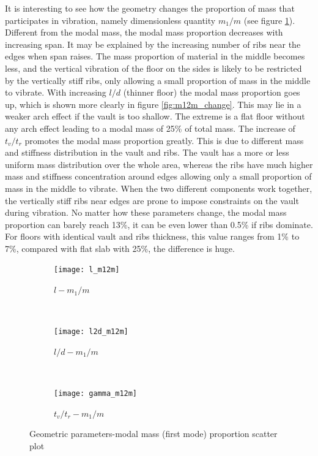 It is interesting to see how the geometry changes the proportion of mass that participates in vibration, namely dimensionless quantity $m_1/m$ (see figure \ref{fig:geom-m12m}). Different from the modal mass, the modal mass proportion decreases with increasing span. It may be explained by the increasing number of ribs near the edges when span raises. The mass proportion of material in the middle becomes less, and the vertical vibration of the floor on the sides is likely to be restricted by the vertically stiff ribs, only allowing a small proportion of mass in the middle to vibrate. With increasing $l/d$ (thinner floor) the modal mass proportion goes up, which is shown more clearly in figure \ref{fig:m12m_change}. This may lie in a weaker arch effect if the vault is too shallow. The extreme is a flat floor without any arch effect leading to a modal mass of 25\% of total mass. The increase of $t_v/t_r$ promotes the modal mass proportion greatly. This is due to different mass and stiffness distribution in the vault and ribs. The vault has a more or less uniform mass distribution over the whole area, whereas the ribs have much higher mass and stiffness concentration around edges allowing only a small proportion of mass in the middle to vibrate. When the two different components work together, the vertically stiff ribs near edges are prone to impose constraints on the vault during vibration. 
No matter how these parameters change, the modal mass proportion can barely reach 13\%, it can be even lower than 0.5\% if ribs dominate. For floors with identical vault and ribs thickness, this value ranges from 1\% to 7\%, compared with flat slab with 25\%, the difference is huge.

\begin{figure}[H]
\begin{subfigure}[b]{.32\textwidth}
  \centering
  \texttt{[image: l\_m12m]}
  \caption{$l-m_1/m$}
\end{subfigure}
~
\begin{subfigure}[b]{.32\textwidth}
  \centering
  \texttt{[image: l2d\_m12m]}
  \caption{$l/d-m_1/m$}
\end{subfigure}
~
\begin{subfigure}[b]{.32\textwidth}
  \centering
  \texttt{[image: gamma\_m12m]}
  \caption{$t_v/t_r-m_1/m$}
\end{subfigure}

\caption{Geometric parameters-modal mass (first mode) proportion scatter plot}
\label{fig:geom-m12m}
\end{figure}

